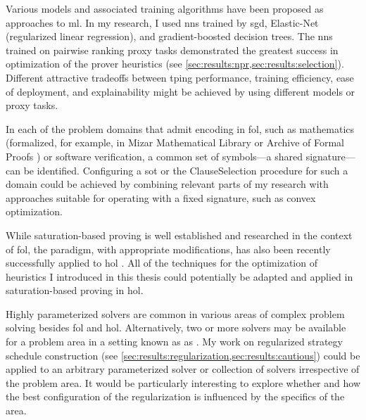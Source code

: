 Various models and associated training algorithms have been proposed as approaches to \gls{ml}.
In my research, I used \glspl{nn} trained by \acrlong{sgd}, Elastic-Net (regularized linear regression), and gradient-boosted decision trees.
The \glspl{nn} trained on pairwise ranking proxy tasks demonstrated the greatest success in optimization of the prover heuristics (see \cref{sec:results:npr,sec:results:selection}).
Different attractive tradeoffs between \gls{tping} performance, training efficiency, ease of deployment, and explainability might be achieved by using different models or proxy tasks.

In each of the problem domains that admit encoding in \gls{fol},
such as mathematics (formalized, for example, in Mizar Mathematical Library \cite{DBLP:journals/jfrea/GrabowskiKN10,DBLP:journals/jar/Urban06} or Archive of Formal Proofs \cite{DBLP:conf/mkm/BlanchetteHMN15,DBLP:conf/itp/DesharnaisVBW22}) or software verification,
a common set of symbols---a shared signature---can be identified.
Configuring a \gls{sot} or the \gls{ClauseSelection} procedure
for such a domain could be achieved by combining relevant parts of my research with approaches suitable for operating with a fixed signature, such as convex optimization.

While saturation-based proving is well established and researched in the context of \gls{fol},
the paradigm, with appropriate modifications, has also been recently successfully applied to \gls{hol} \cite{DBLP:journals/ki/Steen20,DBLP:journals/jar/VukmirovicBBCNT22,DBLP:conf/ijcar/BhayatS24}.
All of the techniques for the optimization of heuristics I introduced in this thesis could potentially be adapted and applied in saturation-based proving in \gls{hol}.

Highly parameterized solvers are common in various areas of complex problem solving besides \gls{fol} and \gls{hol}.
Alternatively, two or more solvers may be available for a problem area in a setting known as \gls{as} \cite{DBLP:journals/ai/BischlKKLMFHHLT16}.
My work on regularized strategy schedule construction (see \cref{sec:results:regularization,sec:results:cautious}) could be applied to an arbitrary parameterized solver or collection of solvers irrespective of the problem area.
It would be particularly interesting to explore whether and how the best configuration of the regularization is influenced by the specifics of the area.

